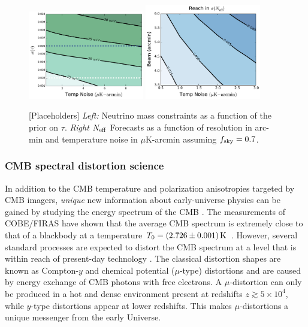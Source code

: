 \begin{figure}[t!]
\begin{center}
\includegraphics[width=0.45\textwidth]{figs/Mnu_tauprior.pdf}
\includegraphics[width=0.45\textwidth]{figs/Neff_space.pdf}
\caption{ [Placeholders] {\it Left:} Neutrino mass constraints as a function of the prior on $\tau$.  {\it Right} ${N_{\rm eff}}$ Forecasts as a function of resolution in arc-min and temperature noise in $\mu$K-arcmin assuming $f_{\rm sky} = 0.7$.}
\label{fig:Neff_future}
\end{center}
\end{figure}



\vspace{-0.15in}
\subsubsection{CMB spectral distortion science}
\vspace{-0.05in}

In addition to the CMB temperature and polarization anisotropies targeted by CMB imagers, {\it unique} new information about early-universe physics can be gained by studying the energy spectrum of the CMB \citep{Sunyaev1970SPEC, Burigana1993, Hu1993, Chluba2011therm}. The measurements of COBE/FIRAS have shown that the average CMB spectrum is extremely close to that of a blackbody at a temperature $T_0=(2.726\pm 0.001)\,{\rm K}$ \citep{Mather1994, Fixsen1996}. However, several standard processes are expected to distort the CMB spectrum \citep[e.g.,][]{Chluba2016LCDM} at a level that is within reach of present-day technology \citep{Kogut2011PIXIE, PRISM2013WPII}. 
%
The classical distortion shapes are known as Compton-$y$ and chemical potential ($\mu$-type) distortions \citep{Zeldovich1969, Sunyaev1970mu} and are caused by energy exchange of CMB photons with free electrons. A $\mu$-distortion can only be produced in a hot and dense environment present at redshifts $z\gtrsim 5\times10^4$, while $y$-type distortions appear at lower redshifts. This makes $\mu$-distortions a unique messenger from the early Universe.

